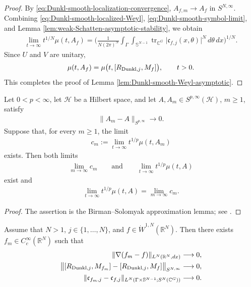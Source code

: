 \documentclass{amsart}
\begin{document}
\begin{proof}
By \eqref{eq:Dunkl-smooth-localization-convergence},
\(A_{f,m}\to A_f\) in \(S^{N,\infty}\). Combining
\eqref{eq:Dunkl-smooth-localized-Weyl},
\eqref{eq:Dunkl-smooth-symbol-limit}, and Lemma
\ref{lem:weak-Schatten-asymptotic-stability}, we obtain
\begin{align*}
\lim_{t\to\infty}
t^{1/N}\mu(t,A_f)
=
\Bigg(
\frac{1}{N(2\pi)^N}
\int_\Gamma
\int_{\mathbb S^{N-1}}
\operatorname{tr}_{\mathbb C^G}
\big|
\mathfrak c_{f,j}(x,\theta)
\big|^N
\,d\theta\,dx
\Bigg)^{1/N}.
\end{align*}
Since \(U\) and \(V\) are unitary,
\[
\mu(t,A_f)
=
\mu
\big(
t,[R_{{\rm Dunkl},j},M_f]
\big),
\qquad
t>0.
\]
This completes the proof of Lemma \ref{lem:Dunkl-smooth-Weyl-asymptotic}.
\end{proof}

\begin{lemma}\label{lem:weak-Schatten-asymptotic-stability}
Let \(0<p<\infty\), let \(\mathcal H\) be a Hilbert space, and let
\(A,A_m\in S^{p,\infty}(\mathcal H)\), \(m\geq1\), satisfy
\begin{align*}
\|A_m-A\|_{S^{p,\infty}}
\longrightarrow0.
\end{align*}
Suppose that, for every \(m\geq1\), the limit
\begin{align*}
c_m
:=
\lim_{t\to\infty}
t^{1/p}\mu(t,A_m)
\end{align*}
exists. Then both limits
\begin{align*}
\lim_{m\to\infty}c_m
\qquad\text{and}\qquad
\lim_{t\to\infty}
t^{1/p}\mu(t,A)
\end{align*}
exist and
\begin{align*}
\lim_{t\to\infty}
t^{1/p}\mu(t,A)
=
\lim_{m\to\infty}c_m.
\end{align*}
\end{lemma}

\begin{proof}
The assertion is the Birman--Solomyak approximation lemma; see \cite[Section~11.6]{MR1192782}.
\end{proof}

\begin{lemma}\label{lem:Dunkl-Weyl-Sobolev-approximation}
Assume that \(N>1\), \(j\in\{1,\ldots,N\}\), and \(f\in\dot W^{1,N}(\mathbb R^N)\). Then there exists \(f_m\in C_c^\infty(\mathbb R^N)\) such that
\begin{align*}
\|\nabla(f_m-f)\|_{L^N(\mathbb R^N,dx)}
&\longrightarrow0,\\
\big\|
[R_{{\rm Dunkl},j},M_{f_m}]
-
[R_{{\rm Dunkl},j},M_f]
\big\|_{S^{N,\infty}}
&\longrightarrow0,\\
\|\mathfrak c_{f_m,j}-\mathfrak c_{f,j}\|_
{L^N(\Gamma\times\mathbb S^{N-1};S^N(\mathbb C^G))}
&\longrightarrow0.
\end{align*}
\end{lemma}
\end{document}
